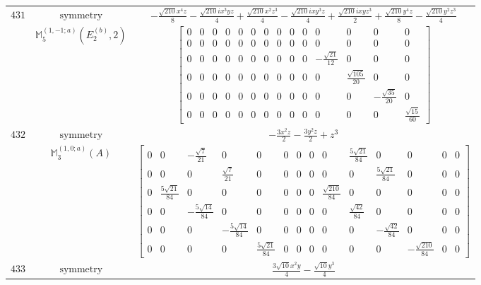 \documentclass[fleqn,8pt,landscape]{jsarticle}
\begin{document}
\begin{longtable}{ccc}
$ 431 $ & $ \text{symmetry} $ & $ - \frac{\sqrt{210} x^{4} z}{8} - \frac{\sqrt{210} i x^{3} y z}{4} + \frac{\sqrt{210} x^{2} z^{3}}{4} - \frac{\sqrt{210} i x y^{3} z}{4} + \frac{\sqrt{210} i x y z^{3}}{2} + \frac{\sqrt{210} y^{4} z}{8} - \frac{\sqrt{210} y^{2} z^{3}}{4} $ \\
$  $ & $ \mathbb{M}_{5}^{(1,-1;a)}(E_{2}^{(b)},2) $ & $ \begin{bmatrix} 0 & 0 & 0 & 0 & 0 & 0 & 0 & 0 & 0 & 0 & 0 & 0 & 0 & 0 \\ 0 & 0 & 0 & 0 & 0 & 0 & 0 & 0 & 0 & 0 & 0 & 0 & 0 & 0 \\ 0 & 0 & 0 & 0 & 0 & 0 & 0 & 0 & 0 & 0 & - \frac{\sqrt{21}}{12} & 0 & 0 & 0 \\ 0 & 0 & 0 & 0 & 0 & 0 & 0 & 0 & 0 & 0 & 0 & \frac{\sqrt{105}}{20} & 0 & 0 \\ 0 & 0 & 0 & 0 & 0 & 0 & 0 & 0 & 0 & 0 & 0 & 0 & - \frac{\sqrt{35}}{20} & 0 \\ 0 & 0 & 0 & 0 & 0 & 0 & 0 & 0 & 0 & 0 & 0 & 0 & 0 & \frac{\sqrt{15}}{60} \end{bmatrix} $ \\ \hline
$ 432 $ & $ \text{symmetry} $ & $ - \frac{3 x^{2} z}{2} - \frac{3 y^{2} z}{2} + z^{3} $ \\
$  $ & $ \mathbb{M}_{3}^{(1,0;a)}(A) $ & $ \begin{bmatrix} 0 & 0 & - \frac{\sqrt{7}}{21} & 0 & 0 & 0 & 0 & 0 & 0 & \frac{5 \sqrt{21}}{84} & 0 & 0 & 0 & 0 \\ 0 & 0 & 0 & \frac{\sqrt{7}}{21} & 0 & 0 & 0 & 0 & 0 & 0 & \frac{5 \sqrt{21}}{84} & 0 & 0 & 0 \\ 0 & \frac{5 \sqrt{21}}{84} & 0 & 0 & 0 & 0 & 0 & 0 & \frac{\sqrt{210}}{84} & 0 & 0 & 0 & 0 & 0 \\ 0 & 0 & - \frac{5 \sqrt{14}}{84} & 0 & 0 & 0 & 0 & 0 & 0 & \frac{\sqrt{42}}{84} & 0 & 0 & 0 & 0 \\ 0 & 0 & 0 & - \frac{5 \sqrt{14}}{84} & 0 & 0 & 0 & 0 & 0 & 0 & - \frac{\sqrt{42}}{84} & 0 & 0 & 0 \\ 0 & 0 & 0 & 0 & \frac{5 \sqrt{21}}{84} & 0 & 0 & 0 & 0 & 0 & 0 & - \frac{\sqrt{210}}{84} & 0 & 0 \end{bmatrix} $ \\ \hline
$ 433 $ & $ \text{symmetry} $ & $ \frac{3 \sqrt{10} x^{2} y}{4} - \frac{\sqrt{10} y^{3}}{4} $ \\

\end{longtable}
\end{document}
